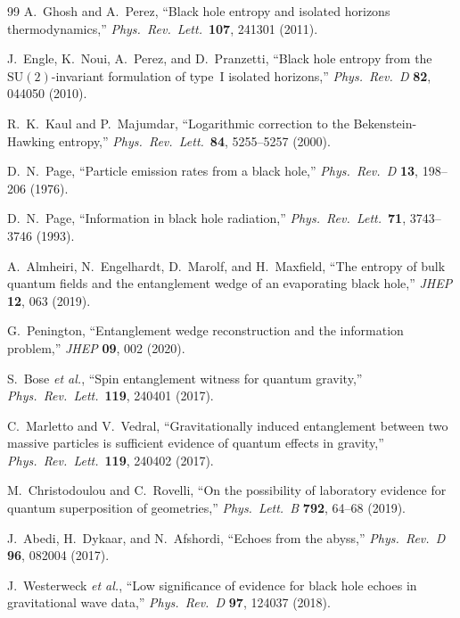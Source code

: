 \documentclass[11pt,letterpaper]{article}
\theoremstyle{definition}
\begin{document}
\begin{thebibliography}{99}
A.~Ghosh and A.~Perez, ``Black hole entropy and isolated horizons
thermodynamics,'' \emph{Phys.\ Rev.\ Lett.}\ \textbf{107}, 241301
(2011).

J.~Engle, K.~Noui, A.~Perez, and D.~Pranzetti, ``Black hole entropy
from the $\mathrm{SU}(2)$-invariant formulation of type~I isolated
horizons,'' \emph{Phys.\ Rev.\ D} \textbf{82}, 044050 (2010).

R.~K.~Kaul and P.~Majumdar, ``Logarithmic correction to the
Bekenstein-Hawking entropy,'' \emph{Phys.\ Rev.\ Lett.}\ \textbf{84},
5255--5257 (2000).

D.~N.~Page, ``Particle emission rates from a black hole,''
\emph{Phys.\ Rev.\ D} \textbf{13}, 198--206 (1976).

D.~N.~Page, ``Information in black hole radiation,''
\emph{Phys.\ Rev.\ Lett.}\ \textbf{71}, 3743--3746 (1993).

A.~Almheiri, N.~Engelhardt, D.~Marolf, and H.~Maxfield, ``The entropy
of bulk quantum fields and the entanglement wedge of an evaporating
black hole,'' \emph{JHEP} \textbf{12}, 063 (2019).

G.~Penington, ``Entanglement wedge reconstruction and the information
problem,'' \emph{JHEP} \textbf{09}, 002 (2020).

S.~Bose \emph{et al.}, ``Spin entanglement witness for quantum
gravity,'' \emph{Phys.\ Rev.\ Lett.}\ \textbf{119}, 240401 (2017).

C.~Marletto and V.~Vedral, ``Gravitationally induced entanglement
between two massive particles is sufficient evidence of quantum
effects in gravity,'' \emph{Phys.\ Rev.\ Lett.}\ \textbf{119}, 240402
(2017).

M.~Christodoulou and C.~Rovelli, ``On the possibility of laboratory
evidence for quantum superposition of geometries,''
\emph{Phys.\ Lett.\ B} \textbf{792}, 64--68 (2019).

J.~Abedi, H.~Dykaar, and N.~Afshordi, ``Echoes from the abyss,''
\emph{Phys.\ Rev.\ D} \textbf{96}, 082004 (2017).

J.~Westerweck \emph{et al.}, ``Low significance of evidence for black
hole echoes in gravitational wave data,'' \emph{Phys.\ Rev.\ D}
\textbf{97}, 124037 (2018).


\end{thebibliography}
\end{document}
